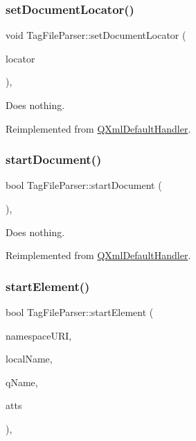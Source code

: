 \subsubsection{\texorpdfstring{setDocumentLocator()}{setDocumentLocator()}}
{\footnotesize\ttfamily void Tag\+File\+Parser\+::set\+Document\+Locator (\begin{DoxyParamCaption}\item[{\mbox{\hyperlink{class_q_xml_locator}{Q\+Xml\+Locator}} $\ast$}]{locator }\end{DoxyParamCaption})\hspace{0.3cm}{\ttfamily [inline]}, {\ttfamily [virtual]}}

Does nothing. 

Reimplemented from \mbox{\hyperlink{class_q_xml_default_handler_add9860b32800232e14f6d4150ed23937}{Q\+Xml\+Default\+Handler}}.

\mbox{\label{class_tag_file_parser_a56d1a932efadb2ddd7e459884ebab4e4}} 
\subsubsection{\texorpdfstring{startDocument()}{startDocument()}}
{\footnotesize\ttfamily bool Tag\+File\+Parser\+::start\+Document (\begin{DoxyParamCaption}{ }\end{DoxyParamCaption})\hspace{0.3cm}{\ttfamily [inline]}, {\ttfamily [virtual]}}

Does nothing. 

Reimplemented from \mbox{\hyperlink{class_q_xml_default_handler_a5a1135641cb81d4053ecd4783c7c252b}{Q\+Xml\+Default\+Handler}}.

\mbox{\label{class_tag_file_parser_ad9f6b4e83d37df58b95a2018d4e2e606}} 
\subsubsection{\texorpdfstring{startElement()}{startElement()}}
{\footnotesize\ttfamily bool Tag\+File\+Parser\+::start\+Element (\begin{DoxyParamCaption}\item[{const \mbox{\hyperlink{class_q_string}{Q\+String}} \&}]{namespace\+U\+RI,  }\item[{const \mbox{\hyperlink{class_q_string}{Q\+String}} \&}]{local\+Name,  }\item[{const \mbox{\hyperlink{class_q_string}{Q\+String}} \&}]{q\+Name,  }\item[{const \mbox{\hyperlink{class_q_xml_attributes}{Q\+Xml\+Attributes}} \&}]{atts }\end{DoxyParamCaption})\hspace{0.3cm}{\ttfamily [inline]}, {\ttfamily [virtual]}}

